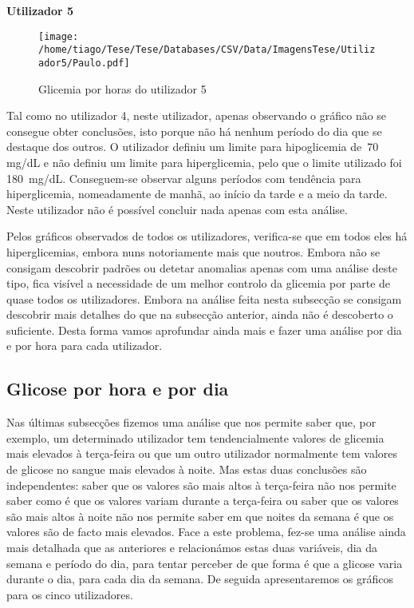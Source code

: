 \textbf{Utilizador 5}


\begin{figure}[H]
\centering
\texttt{[image: /home/tiago/Tese/Tese/Databases/CSV/Data/ImagensTese/Utilizador5/Paulo.pdf]}
\caption{Glicemia por horas do utilizador 5}
\label{fig:uti5}
\end{figure}
Tal como no utilizador 4, neste utilizador, apenas observando o gráfico não se consegue obter conclusões, isto porque não há nenhum período do dia que se destaque dos outros. O utilizador definiu um limite para hipoglicemia de~70 mg/dL e não definiu um limite para hiperglicemia, pelo que o limite utilizado foi 180~mg/dL. Conseguem-se observar alguns períodos com tendência para hiperglicemia, nomeadamente de manhã, ao início da tarde e a meio da tarde. Neste utilizador não é possível concluir nada apenas com esta análise.\newline

Pelos gráficos observados de todos os utilizadores, verifica-se que em todos eles há hiperglicemias, embora nuns notoriamente mais que noutros. Embora não se consigam descobrir padrões ou detetar anomalias apenas com uma análise deste tipo, fica visível a necessidade de um melhor controlo da glicemia por parte de quase todos os utilizadores. Embora na análise feita nesta subsecção se consigam descobrir mais detalhes do que na subsecção anterior, ainda não é descoberto o suficiente. Desta forma vamos aprofundar ainda mais e fazer uma análise por dia e por hora para cada utilizador.

\subsection{Glicose por hora e por dia}

Nas últimas subsecções fizemos uma análise que nos permite saber que, por exemplo, um determinado utilizador tem tendencialmente valores de glicemia mais elevados à terça-feira ou que um outro utilizador normalmente tem valores de glicose no sangue mais elevados à noite. Mas estas duas conclusões são independentes: saber que os valores são mais altos à terça-feira não nos permite saber como é que os valores variam durante a terça-feira ou saber que os valores são mais altos à noite não nos permite saber em que noites da semana é que os valores são de facto mais elevados. Face a este problema, fez-se uma análise ainda mais detalhada que as anteriores e relacionámos estas duas variáveis, dia da semana e período do dia, para tentar perceber de que forma é que a glicose varia durante o dia, para cada dia da semana. De seguida apresentaremos os gráficos para os cinco utilizadores. 

